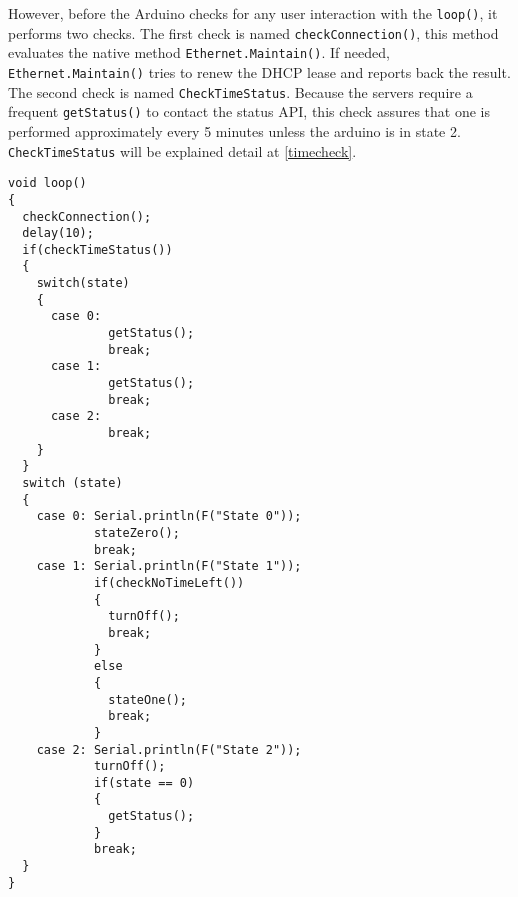 However, before the Arduino checks for any user interaction with the \verb|loop()|, it performs two checks.
The first check is named \verb|checkConnection()|, this method evaluates the native method \verb|Ethernet.Maintain()|.
If needed, \verb|Ethernet.Maintain()| tries to renew the DHCP lease and reports back the result.\newline
The second check is named \verb|CheckTimeStatus|. Because the servers require a frequent \verb|getStatus()| to contact the status API, this check assures that one is performed approximately every 5 minutes unless the arduino is in state 2.
\verb|CheckTimeStatus| will be explained detail at \autoref{timecheck}.

\begin{lstlisting}[frame=single, label=loopy, caption=The Arduino loop.]
void loop()
{  
  checkConnection();
  delay(10);
  if(checkTimeStatus())
  {
    switch(state)
    {
      case 0: 
              getStatus();
              break;      
      case 1: 
              getStatus();
              break;
      case 2: 
              break;           
    }
  }
  switch (state)
  {
    case 0: Serial.println(F("State 0"));
            stateZero();
            break;         
    case 1: Serial.println(F("State 1"));
            if(checkNoTimeLeft())
            {
              turnOff();
              break;
            }
            else
            {
              stateOne();
              break;
            }
    case 2: Serial.println(F("State 2"));
            turnOff();
            if(state == 0)
            {
              getStatus();
            }
            break;             
  }
}
\end{lstlisting}

